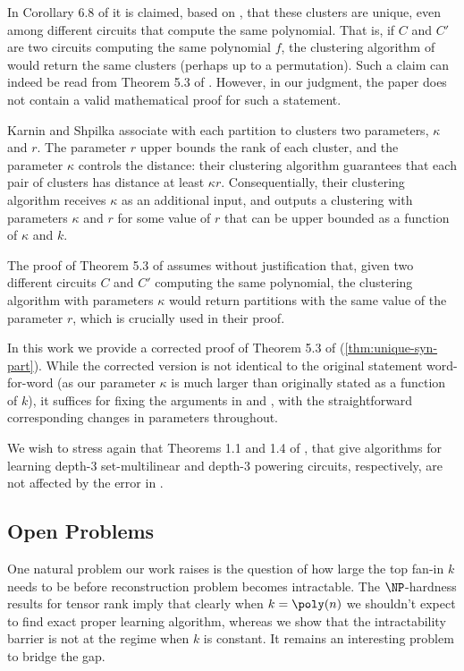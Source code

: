 \documentclass[12pt]{article}
\begin{document}
	In Corollary 6.8 of \cite{BSV21} it is claimed, based on \cite{KarninShpilka09}, that these clusters are unique, even among different circuits that compute the same polynomial. That is, if $C$ and $C'$ are two circuits computing the same polynomial $f$, the clustering algorithm of \cite{KarninShpilka09} would return the same clusters (perhaps up to a permutation). Such a claim can indeed be read from Theorem 5.3 of \cite{KarninShpilka09}. However, in our judgment, the paper \cite{KarninShpilka09} does not contain a valid mathematical proof for such a statement.
	
	Karnin and Shpilka associate with each partition to clusters two parameters, $\kappa$ and $r$. The parameter $r$ upper bounds the rank of each cluster, and the parameter $\kappa$ controls the distance: their clustering algorithm guarantees that each pair of clusters has distance at least $\kappa r$. Consequentially, their clustering algorithm receives $\kappa$ as an additional input, and outputs a clustering with parameters $\kappa$ and $r$ for some value of $r$ that can be upper bounded as a function of $\kappa$ and $k$.
	
	The proof of Theorem 5.3 of \cite{KarninShpilka09} assumes without justification that, given two different circuits $C$ and $C'$ computing the same polynomial, the clustering algorithm with parameters $\kappa$ would return partitions with the same value of the parameter $r$, which is crucially used in their proof.
	
	
	In this work we provide a corrected proof of Theorem 5.3 of \cite{KarninShpilka09} (\autoref{thm:unique-syn-part}). While the corrected version is not identical to the original statement word-for-word (as our parameter $\kappa$ is much larger than originally stated as a function of $k$), it suffices for fixing the arguments in \cite{KarninShpilka09} and \cite{BSV21}, with the straightforward corresponding changes in parameters throughout.
	
	We wish to stress again that Theorems 1.1 and 1.4 of \cite{BSV21}, that give algorithms for learning depth-$3$ set-multilinear and depth-$3$ powering circuits, respectively, are not affected by the error in \cite{KarninShpilka09}.
	
	\subsection{Open Problems}
	\label{sec:open}
	
	One natural problem our work raises is the question of how large the top fan-in $k$ needs to be before reconstruction problem becomes intractable. The $\NP$-hardness results for tensor rank imply that clearly when $k=\poly(n)$ we shouldn't expect to find exact proper learning algorithm, whereas we show that the intractability barrier is not at the regime when $k$ is constant. It remains an interesting problem to bridge the gap.
	
\end{document}
